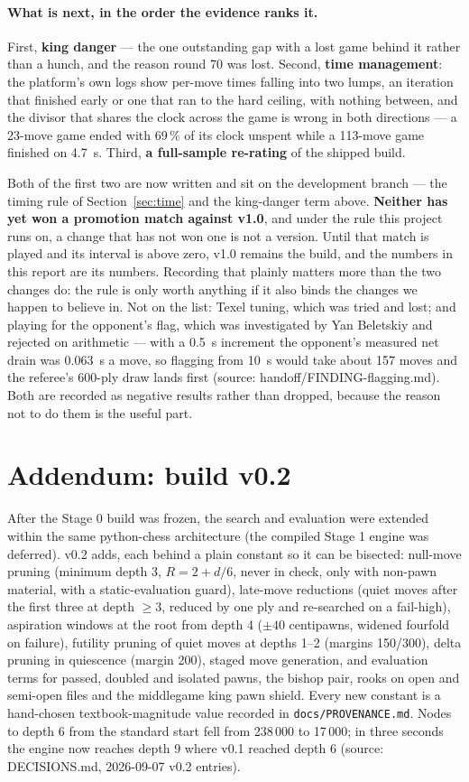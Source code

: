 \documentclass[11pt,a4paper]{article}
\newcommand{\src}[1]{{\small(source: #1)}}
\newcommand{\code}[1]{\texttt{#1}}
\begin{document}
\paragraph{What is next, in the order the evidence ranks it.} First, \textbf{king danger} --- the one
outstanding gap with a lost game behind it rather than a hunch, and the reason round 70 was lost. Second,
\textbf{time management}: the platform's own logs show per-move times falling into two lumps, an iteration
that finished early or one that ran to the hard ceiling, with nothing between, and the divisor that shares
the clock across the game is wrong in both directions --- a 23-move game ended with 69\,\% of its clock
unspent while a 113-move game finished on 4.7~s. Third, \textbf{a full-sample re-rating} of the shipped
build.

Both of the first two are now written and sit on the development branch --- the timing rule of
Section~\ref{sec:time} and the king-danger term above. \textbf{Neither has yet won a promotion match
against v1.0}, and under the rule this project runs on, a change that has not won one is not a version.
Until that match is played and its interval is above zero, v1.0 remains the build, and the numbers in this
report are its numbers. Recording that plainly matters more than the two changes do: the rule is only
worth anything if it also binds the changes we happen to believe in. Not on the list: Texel tuning, which was tried and lost; and playing for the opponent's flag, which
was investigated by Yan Beletskiy and rejected on arithmetic --- with a 0.5~s increment the opponent's
measured net drain was 0.063~s a move, so flagging from 10~s would take about 157 moves and the referee's
600-ply draw lands first \src{handoff/FINDING-flagging.md}. Both are recorded as negative results rather
than dropped, because the reason not to do them is the useful part.


\section*{Addendum: build v0.2}
After the Stage 0 build was frozen, the search and evaluation were extended within the same
python-chess architecture (the compiled Stage 1 engine was deferred). v0.2 adds, each behind a
plain constant so it can be bisected: null-move pruning (minimum depth 3, $R = 2 + d/6$, never in
check, only with non-pawn material, with a static-evaluation guard), late-move reductions (quiet
moves after the first three at depth $\geq 3$, reduced by one ply and re-searched on a fail-high),
aspiration windows at the root from depth 4 ($\pm 40$ centipawns, widened fourfold on failure),
futility pruning of quiet moves at depths 1--2 (margins 150/300), delta pruning in quiescence
(margin 200), staged move generation, and evaluation terms for passed, doubled and isolated pawns,
the bishop pair, rooks on open and semi-open files and the middlegame king pawn shield. Every new
constant is a hand-chosen textbook-magnitude value recorded in \code{docs/PROVENANCE.md}. Nodes to
depth 6 from the standard start fell from 238\,000 to 17\,000; in three seconds the engine now
reaches depth 9 where v0.1 reached depth 6 \src{DECISIONS.md, 2026-09-07 v0.2 entries}.
\end{document}

